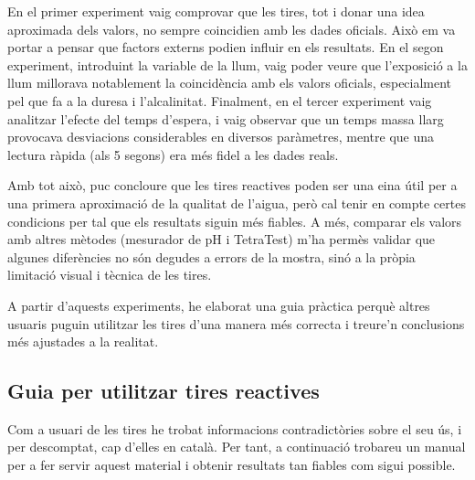 En el primer experiment vaig comprovar que les tires, tot i donar una idea aproximada dels valors, no sempre coincidien amb les dades oficials. Això em va portar a pensar que factors externs podien influir en els resultats. En el segon experiment, introduint la variable de la llum, vaig poder veure que l’exposició a la llum millorava notablement la coincidència amb els valors oficials, especialment pel que fa a la duresa i l’alcalinitat. Finalment, en el tercer experiment vaig analitzar l’efecte del temps d’espera, i vaig observar que un temps massa llarg provocava desviacions considerables en diversos paràmetres, mentre que una lectura ràpida (als 5 segons) era més fidel a les dades reals.

Amb tot això, puc concloure que les tires reactives poden ser una eina útil per a una primera aproximació de la qualitat de l’aigua, però cal tenir en compte certes condicions per tal que els resultats siguin més fiables. A més, comparar els valors amb altres mètodes (mesurador de pH i TetraTest) m’ha permès validar que algunes diferències no són degudes a errors de la mostra, sinó a la pròpia limitació visual i tècnica de les tires.

A partir d’aquests experiments, he elaborat una guia pràctica perquè altres usuaris puguin utilitzar les tires d’una manera més correcta i treure’n conclusions més ajustades a la realitat.

\subsection{Guia per utilitzar tires reactives}

Com a usuari de les tires he trobat informacions contradictòries sobre el seu ús, i per descomptat, cap d'elles en català. Per tant, a continuació trobareu un manual per a fer servir aquest material i obtenir resultats tan fiables com sigui possible.

